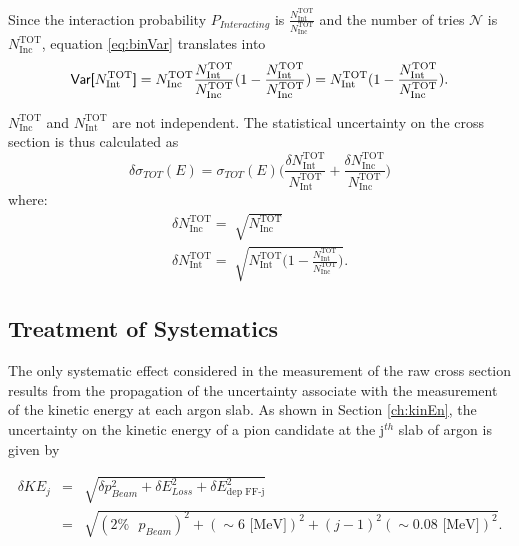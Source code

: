 Since the interaction probability $P_{Interacting}$ is $\frac{ N^{\text{TOT}}_{\text{Int}}}{N^{\text{TOT}}_{\text{Inc}}}$ and the number of tries $\mathcal{N}$ is $N^{\text{TOT}}_{\text{Inc}}$, equation \ref{eq:binVar} translates into
\begin{equation}
\text{\textsf{Var[}} N^{\text{TOT}}_{\text{Int}} \text{\textsf{]}}
= N^{\text{TOT}}_{\text{Inc}}\frac{ N^{\text{TOT}}_{\text{Int}}}{N^{\text{TOT}}_{\text{Inc}}} (1-\frac{ N^{\text{TOT}}_{\text{Int}}}{N^{\text{TOT}}_{\text{Inc}}}) = N^{\text{TOT}}_{\text{Int}}(1-\frac{ N^{\text{TOT}}_{\text{Int}}}{N^{\text{TOT}}_{\text{Inc}}}). 
\end{equation}

$N^{\text{TOT}}_{\text{Inc}}$ and $N^{\text{TOT}}_{\text{Int}}$ are not independent.
The statistical uncertainty on the cross section is thus calculated as 
\begin{equation}
\delta\sigma_{TOT}(E) = \sigma_{TOT}(E) \Big(\frac{\delta N^{\text{TOT}}_{\text{Int}}}{N^{\text{TOT}}_{\text{Int}}}+\frac{\delta N^{\text{TOT}}_{\text{Inc}}}{N^{\text{TOT}}_{\text{Inc}}}\Big) 
\end{equation}
where:
\begin{eqnarray}
\delta N^{\text{TOT}}_{\text{Inc}} = \sqrt[]{N^{\text{TOT}}_{\text{Inc}}} \\
\delta N^{\text{TOT}}_{\text{Int}} = \sqrt[]{N^{\text{TOT}}_{\text{Int}}\Big(1-\frac{ N^{\text{TOT}}_{\text{Int}}}{N^{\text{TOT}}_{\text{Inc}}}\Big)}.
\end{eqnarray}



\subsection{Treatment of Systematics} \label{ch:SysUncertaintyXSRaw}
The only systematic effect considered in the measurement of the raw cross section results from the propagation of the uncertainty associate with the measurement of the kinetic energy at each argon slab. As shown in Section \ref{ch:kinEn}, the uncertainty on the kinetic energy of a pion candidate at the j$^{th}$ slab of argon  is given by

\begin{eqnarray}
\delta KE_{j} &=& \sqrt{\delta p_{Beam}^2 + \delta E_{Loss}^2 +  \delta  E_{\text{dep FF-j}}^2}\\
&=& \sqrt{(2\% \text{ }p_{Beam})^2 +  (\sim 6 \text{ [MeV]})^2 +  (j-1)^2 (\sim0.08\text{ [MeV]})^2}.
\end{eqnarray}


